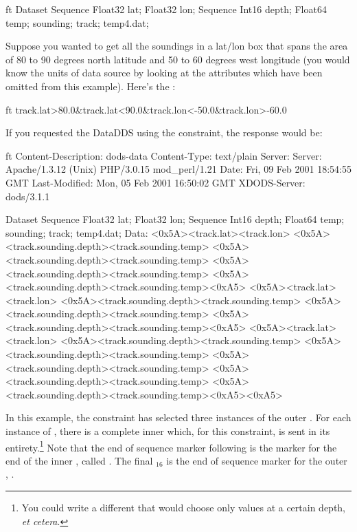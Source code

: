 \documentclass[justify]{nasa-ese}
\begin{document}
\begin{vcode}{ft}
Dataset {
  Sequence {
    Float32 lat;
    Float32 lon;
    Sequence {
      Int16 depth;
      Float64 temp;
    } sounding;
  } track;
} temp4.dat;
\end{vcode}

Suppose you wanted to get all the soundings in a lat/lon box that spans the
area of 80 to 90 degrees north latitude and 50 to 60 degrees west longitude
(you would know the units of data source by looking at the attributes which
have been omitted from this example). Here's the \CE:

\begin{vcode}{ft}
track.lat>80.0&track.lat<90.0&track.lon<-50.0&track.lon>-60.0
\end{vcode}
\label{ex-last}
If you requested the DataDDS using the constraint, the response would be:

\begin{vcode}{ft}
Content-Description: dods-data
Content-Type: text/plain
Server: Server: Apache/1.3.12 (Unix)  PHP/3.0.15 mod_perl/1.21
Date: Fri, 09 Feb 2001 18:54:55 GMT
Last-Modified: Mon, 05 Feb 2001 16:50:02 GMT
XDODS-Server: dods/3.1.1

Dataset {
  Sequence {
    Float32 lat;
    Float32 lon;
    Sequence {
      Int16 depth;
      Float64 temp;
    } sounding;
  } track;
} temp4.dat;
Data:
<0x5A><track.lat><track.lon>
<0x5A><track.sounding.depth><track.sounding.temp>
<0x5A><track.sounding.depth><track.sounding.temp>
<0x5A><track.sounding.depth><track.sounding.temp>
<0x5A><track.sounding.depth><track.sounding.temp><0xA5>
<0x5A><track.lat><track.lon>
<0x5A><track.sounding.depth><track.sounding.temp>
<0x5A><track.sounding.depth><track.sounding.temp>
<0x5A><track.sounding.depth><track.sounding.temp><0xA5>
<0x5A><track.lat><track.lon>
<0x5A><track.sounding.depth><track.sounding.temp>
<0x5A><track.sounding.depth><track.sounding.temp>
<0x5A><track.sounding.depth><track.sounding.temp>
<0x5A><track.sounding.depth><track.sounding.temp>
<0x5A><track.sounding.depth><track.sounding.temp><0xA5><0xA5>
\end{vcode}

In this example, the constraint has selected three instances of the outer
\Sequence {}. For each instance of , there is a complete
inner \Sequence {} which, for this constraint, is sent in its
entirety.\footnote{You could write a different \CE that would choose only
values at a certain depth, {\it et cetera}.} Note that the end of sequence
marker following  is the marker for the end of the
inner \Sequence, called . The final $_{16}$ is the end
of sequence marker for the outer \Sequence, .
\end{document}
